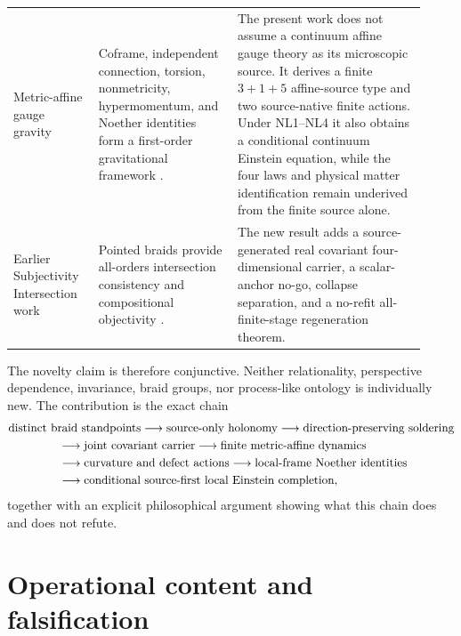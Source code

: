\documentclass[11pt]{article}
\theoremstyle{definition}
\theoremstyle{remark}
\begin{document}
{\begin{longtable}{>{\raggedright\arraybackslash}p{0.19\linewidth}>{\raggedright\arraybackslash}p{0.31\linewidth}>{\raggedright\arraybackslash}p{0.42\linewidth}}
Metric-affine gauge gravity & Coframe, independent connection, torsion, nonmetricity, hypermomentum, and Noether identities form a first-order gravitational framework \cite{hehl1995}. & The present work does not assume a continuum affine gauge theory as its microscopic source. It derives a finite $3+1+5$ affine-source type and two source-native finite actions. Under NL1--NL4 it also obtains a conditional continuum Einstein equation, while the four laws and physical matter identification remain underived from the finite source alone. \\
Earlier Subjectivity Intersection work & Pointed braids provide all-orders intersection consistency and compositional objectivity \cite{watanabe2026braid}. & The new result adds a source-generated real covariant four-dimensional carrier, a scalar-anchor no-go, collapse separation, and a no-refit all-finite-stage regeneration theorem. \\
\bottomrule
\end{longtable}
}

The novelty claim is therefore conjunctive. Neither relationality, perspective dependence, invariance, braid groups, nor process-like ontology is individually new. The contribution is the exact chain
\begin{equation}\label{eq:novelchain}
\begin{aligned}
&\text{distinct braid standpoints}
\longrightarrow\text{source-only holonomy}
\longrightarrow\text{direction-preserving soldering}\\
 &\hspace{15mm}\longrightarrow\text{joint covariant carrier}
 \longrightarrow\text{finite metric-affine dynamics}\\
 &\hspace{15mm}\longrightarrow\text{curvature and defect actions}
 \longrightarrow\text{local-frame Noether identities}\\
 &\hspace{15mm}\longrightarrow\text{conditional source-first local Einstein completion},
\end{aligned}
\end{equation}
together with an explicit philosophical argument showing what this chain does and does not refute.

\section{Operational content and falsification}
\end{document}
